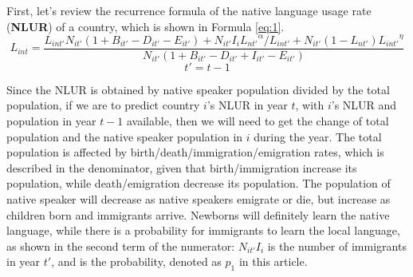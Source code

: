 \documentclass{mcmthesis}
\begin{document}
First, let's review the recurrence formula of the native language usage rate (\textbf{NLUR}) of a country, which is shown in Formula \ref{eq:1}.
\begin{equation} \label{eq:1}
    L_{int} = \frac{L_{int'}N_{it'}(1+B_{it'}-D_{it'}-E_{it'})+N_{it'}I_i{L_{nt'}}^\alpha/L_{int'}+N_{it'}(1-L_{nt'}){L_{int'}}^\eta}{N_{it'}(1+B_{it'}-D_{it'}+I_{it'}-E_{it'})}
\end{equation}
\begin{equation*}
    t'=t-1
\end{equation*}


Since the NLUR is obtained by native speaker population divided by the total population, if we are to predict country $i$'s NLUR in year $t$, with $i$'s NLUR and population in year $t-1$ available, then we will need to get the change of total population and the native speaker population in $i$ during the year. The total population is affected by birth/death/immigration/emigration rates, which is described in the denominator, given that birth/immigration increase its population, while death/emigration decrease its population. The population of native speaker will decrease as native speakers emigrate or die, but increase as children born and immigrants arrive. Newborns will definitely learn the native language, while there is a probability for immigrants to learn the local language, as shown in the second term of the numerator: $N_{it'}I_i$ is the number of immigrants in year $t'$, and  is the probability, denoted as $p_1$ in this article.
\end{document}
